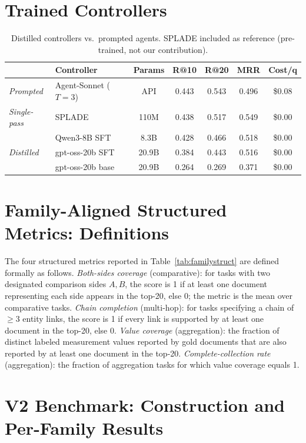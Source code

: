 \documentclass{article}
\begin{document}
\section{Trained Controllers}
\label{app:trained}

\begin{table}[ht]
\centering
\caption{Distilled controllers vs.\ prompted agents. SPLADE included as reference (pre-trained, not our contribution).}
\small
\begin{tabular}{llccccc}
\toprule
& \textbf{Controller} & \textbf{Params} & \textbf{R@10} & \textbf{R@20} & \textbf{MRR} & \textbf{Cost/q} \\
\midrule
\emph{Prompted} & Agent-Sonnet ($T{=}3$) & API & 0.443 & 0.543 & 0.496 & \$0.08 \\
\emph{Single-pass} & SPLADE & 110M & 0.438 & 0.517 & 0.549 & \$0.00 \\
\midrule
\multirow{3}{*}{\emph{Distilled}} & Qwen3-8B SFT & 8.3B & 0.428 & 0.466 & 0.518 & \$0.00 \\
& gpt-oss-20b SFT & 20.9B & 0.384 & 0.443 & 0.516 & \$0.00 \\
& gpt-oss-20b base & 20.9B & 0.264 & 0.269 & 0.371 & \$0.00 \\
\bottomrule
\end{tabular}
\end{table}

\section{Family-Aligned Structured Metrics: Definitions}
\label{app:familymetrics}

The four structured metrics reported in Table~\ref{tab:familystruct} are defined formally as follows. \emph{Both-sides coverage} (comparative): for tasks with two designated comparison sides $A,B$, the score is 1 if at least one document representing each side appears in the top-20, else 0; the metric is the mean over comparative tasks. \emph{Chain completion} (multi-hop): for tasks specifying a chain of $\geq 3$ entity links, the score is 1 if every link is supported by at least one document in the top-20, else 0. \emph{Value coverage} (aggregation): the fraction of distinct labeled measurement values reported by gold documents that are also reported by at least one document in the top-20. \emph{Complete-collection rate} (aggregation): the fraction of aggregation tasks for which value coverage equals 1.

\section{V2 Benchmark: Construction and Per-Family Results}
\label{app:v2}
\end{document}
